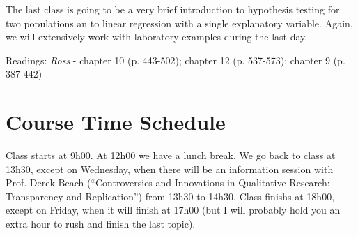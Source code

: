 \documentclass[a4paper,11pt]{article}
\begin{document}
The last class is going to be a very brief introduction to hypothesis testing for two populations an to linear regression with a single explanatory variable. Again, we will extensively work with laboratory examples during the last day.

Readings: \emph{Ross} - chapter 10 (p. 443-502); chapter 12 (p. 537-573); chapter 9 (p. 387-442)

\section{Course Time Schedule}

Class starts at 9h00. At 12h00 we have a lunch break. We go back to class at 13h30, except on Wednesday, when there will be an information session with Prof. Derek Beach (``Controversies and Innovations in Qualitative Research: Transparency and Replication'') from 13h30 to 14h30. Class finishs at 18h00, except on Friday, when it will finish at 17h00 (but I will probably hold you an extra hour to rush and finish the last topic).
\end{document}
